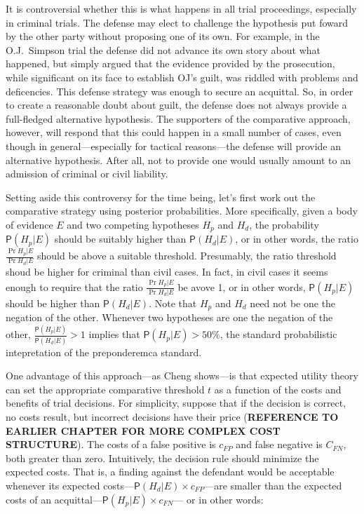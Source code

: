 \documentclass[10pt,dvipsnames,enabledeprecatedfontcommands]{scrartcl}
\newcommand{\pr}[1]{\mathsf{P}(#1)}
\begin{document}
It is controversial whether this is what happens in all trial
proceedings, especially in criminal trials. The defense may elect to
challenge the hypothesis put foward by the other party without proposing
one of its own. For example, in the O.J.~Simpson trial the defense did
not advance its own story about what happened, but simply argued that
the evidence provided by the prosecution, while significant on its face
to establish OJ's guilt, was riddled with problems and deficencies. This
defense strategy was enough to secure an acquittal. So, in order to
create a reasonable doubt about guilt, the defense does not always
provide a full-fledged alternative hypothesis. The supporters of the
comparative approach, however, will respond that this could happen in a
small number of cases, even though in general---especially for tactical
reasons---the defense will provide an alternative hypothesis. After all,
not to provide one would usually amount to an admission of criminal or
civil liability.

Setting aside this controversy for the time being, let's first work out
the comparative strategy using posterior probabilities. More
specifically, given a body of evidence \(E\) and two competing
hypotheses \(H_p\) and \(H_d\), the probability \(\pr{H_p | E}\) should
be suitably higher than \(\pr{H_d | E}\), or in other words, the ratio
\(\frac{\Pr{H_p | E}}{\Pr{H_d | E}}\) should be above a suitable
threshold. Presumably, the ratio threshold shoud be higher for criminal
than civil cases. In fact, in civil cases it seems enough to require
that the ratio \(\frac{\Pr{H_p | E}}{\Pr{H_d | E}}\) be avove 1, or in
other words, \(\pr{H_p | E}\) should be higher than \(\pr{H_d | E}\).
Note that \(H_p\) and \(H_d\) need not be one the negation of the other.
Whenever two hypotheses are one the negation of the other,
\(\frac{\pr{H_p | E}}{\pr{H_d | E}}>1\) implies that
\(\pr{H_p | E}>50\%\), the standard probabilistic intepretation of the
preponderemca standard.

One advantage of this approach---as Cheng shows---is that expected
utility theory can set the appropriate comparative threshold \(t\) as a
function of the costs and benefits of trial decisions. For simplicity,
suppose that if the decision is correct, no costs result, but incorrect
decisions have their price (\textbf{REFERENCE TO EARLIER CHAPTER 
FOR MORE COMPLEX COST STRUCTURE}). The costs of a false positive is
\(c_{FP}\) and false negative is \(C_{FN}\), both greater than zero.
Intuitively, the decision rule should minimize the expected costs. That
is, a finding against the defendant would be acceptable whenever its
expected costs---\(\pr{H_d \vert E} \times c_{FP}\)---are smaller than
the expected costs of an
acquittal---\(\pr{H_p \vert E}\times c_{FN}\)--- or in other words:
\end{document}
